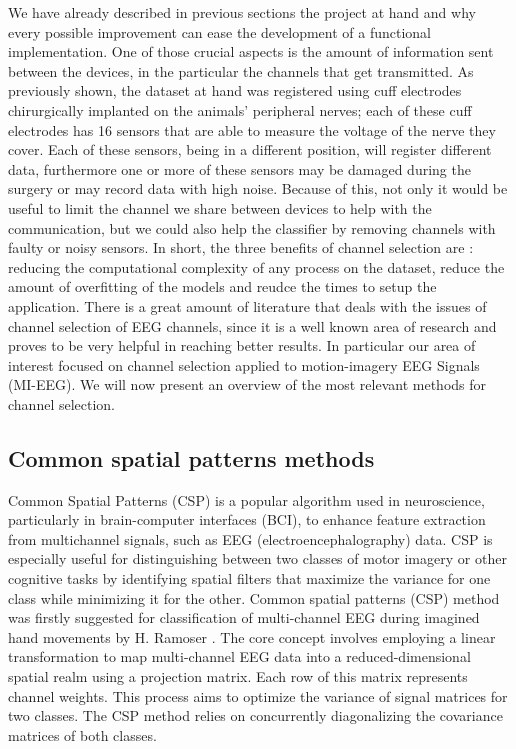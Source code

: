\documentclass{Configuration_Files/PoliMi3i_thesis}
\begin{document}
We have already described in previous sections the project at hand and why every possible improvement can ease the development of a functional implementation.
One of those crucial aspects is the amount of information sent between the devices, in the particular the channels that get transmitted.
As previously shown, the dataset at hand was registered using cuff electrodes chirurgically implanted on the animals' peripheral nerves; each of these cuff electrodes has 16 sensors that are able to measure the voltage of the nerve they cover.
Each of these sensors, being in a different position, will register different data, furthermore one or more of these sensors may be damaged during the surgery or may record data with high noise.
Because of this, not only it would be useful to limit the channel we share between devices to help with the communication, but we could also help the classifier by removing channels with faulty or noisy sensors.
In short, the three benefits of channel selection are : reducing the computational complexity of any process on the dataset, reduce the amount of overfitting of the models and reudce the times to setup the application. \cite{alotaibyReviewChannelSelection2015}
There is a great amount of literature that deals with the issues of channel selection of EEG channels, since it is a well known area of research and proves to be very helpful in reaching better results.
In particular our area of interest focused on channel selection applied to motion-imagery EEG Signals (MI-EEG).
We will now present an overview of the most relevant methods for channel selection.

\subsection{Common spatial patterns methods}

Common Spatial Patterns (CSP) is a popular algorithm used in neuroscience, particularly in brain-computer interfaces (BCI), to enhance feature extraction from multichannel signals, such as EEG (electroencephalography) data. CSP is especially useful for distinguishing between two classes of motor imagery or other cognitive tasks by identifying spatial filters that maximize the variance for one class while minimizing it for the other.
Common spatial patterns (CSP) method was firstly suggested for classification of multi-channel EEG during imagined hand movements by H. Ramoser \cite{ramoserOptimalSpatialFiltering2000}. The core concept involves employing a linear transformation to map multi-channel EEG data into a reduced-dimensional spatial realm using a projection matrix. Each row of this matrix represents channel weights. This process aims to optimize the variance of signal matrices for two classes. The CSP method relies on concurrently diagonalizing the covariance matrices of both classes. \cite{abdullahEEGChannelSelection2022}
\end{document}
